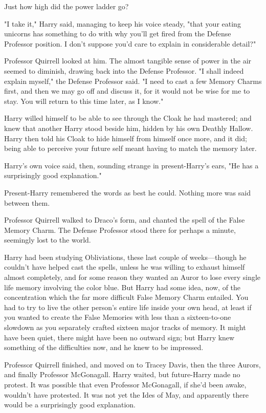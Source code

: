 Just how high did the power ladder go?

"I take it," Harry said, managing to keep his voice steady, "that your eating 
unicorns has something to do with why you'll get fired from the Defense 
Professor position. I don't suppose you'd care to explain in considerable 
detail?"

Professor Quirrell looked at him. The almost tangible sense of power in the air 
seemed to diminish, drawing back into the Defense Professor. "I shall indeed 
explain myself," the Defense Professor said. "I need to cast a few Memory 
Charms first, and then we may go off and discuss it, for it would not be wise 
for me to stay. You will return to this time later, as I know."

Harry willed himself to be able to see through the Cloak he had mastered; and 
knew that another Harry stood beside him, hidden by his own Deathly Hallow. 
Harry then told his Cloak to hide himself from himself once more, and it did; 
being able to perceive your future self meant having to match the memory later.

Harry's own voice said, then, sounding strange in present-Harry's ears, "He has 
a surprisingly good explanation."

Present-Harry remembered the words as best he could. Nothing more was said 
between them.

Professor Quirrell walked to Draco's form, and chanted the spell of the False 
Memory Charm. The Defense Professor stood there for perhaps a minute, seemingly 
lost to the world.

Harry had been studying Obliviations, these last couple of weeks---though he 
couldn't have helped cast the spells, unless he was willing to exhaust himself 
almost completely, and for some reason they wanted an Auror to lose every 
single life memory involving the color blue. But Harry had some idea, now, of 
the concentration which the far more difficult False Memory Charm entailed. You 
had to try to live the other person's entire life inside your own head, at 
least if you wanted to create the False Memories with less than a 
sixteen-to-one slowdown as you separately crafted sixteen major tracks of 
memory. It might have been quiet, there might have been no outward sign; but 
Harry knew something of the difficulties now, and he knew to be impressed.

Professor Quirrell finished, and moved on to Tracey Davis, then the three 
Aurors, and finally Professor McGonagall. Harry waited, but future-Harry made 
no protest. It was possible that even Professor McGonagall, if she'd been 
awake, wouldn't have protested. It was not yet the Ides of May, and apparently 
there would be a surprisingly good explanation.

